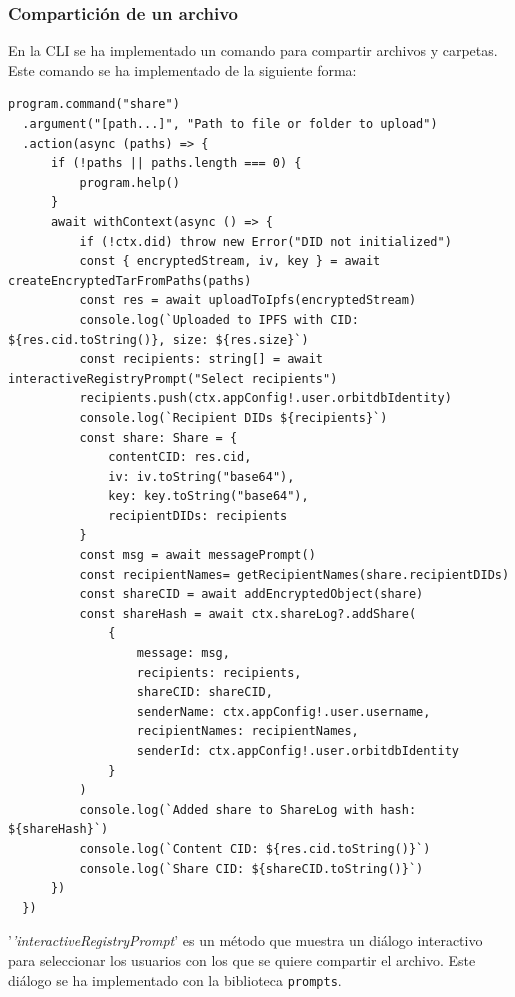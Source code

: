 \subsubsection{Compartición de un archivo}
En la CLI se ha implementado un comando para compartir archivos y carpetas. Este comando se ha implementado de la siguiente forma:
\begin{verbatim}
program.command("share")
  .argument("[path...]", "Path to file or folder to upload")
  .action(async (paths) => {
      if (!paths || paths.length === 0) {
          program.help()
      }
      await withContext(async () => {
          if (!ctx.did) throw new Error("DID not initialized")
          const { encryptedStream, iv, key } = await createEncryptedTarFromPaths(paths)
          const res = await uploadToIpfs(encryptedStream)
          console.log(`Uploaded to IPFS with CID: ${res.cid.toString()}, size: ${res.size}`)
          const recipients: string[] = await interactiveRegistryPrompt("Select recipients")
          recipients.push(ctx.appConfig!.user.orbitdbIdentity)
          console.log(`Recipient DIDs ${recipients}`)
          const share: Share = {
              contentCID: res.cid, 
              iv: iv.toString("base64"), 
              key: key.toString("base64"), 
              recipientDIDs: recipients
          }
          const msg = await messagePrompt()
          const recipientNames= getRecipientNames(share.recipientDIDs)
          const shareCID = await addEncryptedObject(share)
          const shareHash = await ctx.shareLog?.addShare(
              {
                  message: msg,
                  recipients: recipients,
                  shareCID: shareCID,
                  senderName: ctx.appConfig!.user.username,
                  recipientNames: recipientNames, 
                  senderId: ctx.appConfig!.user.orbitdbIdentity
              }
          ) 
          console.log(`Added share to ShareLog with hash: ${shareHash}`)
          console.log(`Content CID: ${res.cid.toString()}`)
          console.log(`Share CID: ${shareCID.toString()}`)
      })
  })
\end{verbatim}

'\textit{'interactiveRegistryPrompt}' es un método que muestra un diálogo interactivo para seleccionar los usuarios con los que se quiere compartir el archivo. Este diálogo se ha implementado con la biblioteca \texttt{prompts}.

